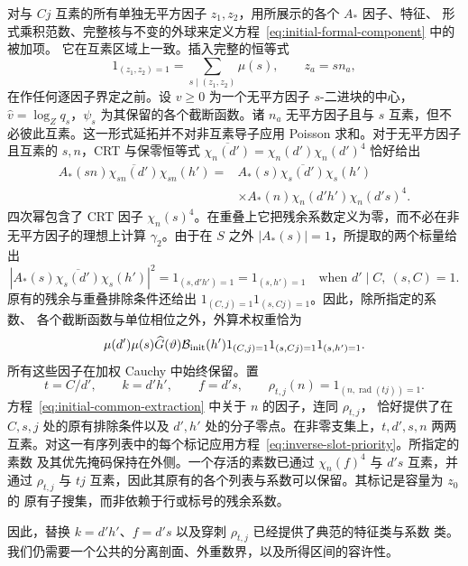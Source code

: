 对与 \(Cj\) 互素的所有单独无平方因子 \(z_1,z_2\)，用所展示的各个 \(A_*\) 因子、特征、
形式乘积范数、完整核与不变的外球来定义方程~\eqref{eq:initial-formal-component} 中的被加项。
它在互素区域上一致。插入完整的恒等式
\[
 1_{(z_1,z_2)=1}=\sum_{s\mid(z_1,z_2)}\mu(s),\qquad z_a=sn_a,
\]
在作任何逐因子界定之前。设 \(v\ge0\) 为一个无平方因子 \(s\)-二进块的中心，
\(\widehat v=\log_Zq_s\)，\(\psi_s\) 为其保留的各个截断函数。诸 \(n_a\) 无平方因子且与 \(s\)
互素，但不必彼此互素。这一形式延拓并不对非互素导子应用 Poisson 求和。对于无平方因子且互素的
\(s,n\)，CRT 与保零恒等式 \(\overline{\chi_n(d')}=\chi_n(d')\chi_n(d')^4\) 恰好给出
\begin{equation}\label{eq:initial-common-extraction}
 \begin{split}
 A_*(sn)\overline{\chi_{sn}(d')}\chi_{sn}(h')
 ={}&A_*(s)\overline{\chi_s(d')}\chi_s(h')\\
 &\times A_*(n)\chi_n(d'h')\chi_n(d's)^4.
 \end{split}
\end{equation}
四次幂包含了 CRT 因子 \(\chi_n(s)^4\)。在重叠上它把残余系数定义为零，而不必在非
无平方因子的理想上计算 \(\gamma_2\)。由于在 \(S\) 之外 \(|A_*(s)|=1\)，所提取的两个标量给出
\[
 |A_*(s)\overline{\chi_s(d')}\chi_s(h')|^2
 =1_{(s,d'h')=1}=1_{(s,h')=1}
 \quad\text{when }d'\mid C,\ (s,C)=1.
\]
原有的残余与重叠排除条件还给出 \(1_{(C,j)=1}1_{(s,Cj)=1}\)。因此，除所指定的系数、
各个截断函数与单位相位之外，外算术权重恰为
\begin{equation}\label{eq:initial-outer-arithmetic}
 \mu(d')\mu(s)\widehat G(\vartheta)\mathcal B_{\rm init}(h')
 1_{(C,j)=1}1_{(s,Cj)=1}1_{(s,h')=1}.
\end{equation}
所有这些因子在加权 Cauchy 中始终保留。置
\[
 t=C/d',\qquad k=d'h',\qquad f=d's,\qquad
 \rho_{t,j}(n)=1_{(n,\operatorname{rad}(tj))=1}.
\]
方程~\eqref{eq:initial-common-extraction} 中关于 \(n\) 的因子，连同 \(\rho_{t,j}\)，
恰好提供了在 \(C,s,j\) 处的原有排除条件以及 \(d',h'\) 处的分子零点。在非零支集上，\(t,d',s,n\)
两两互素。对这一有序列表中的每个标记应用方程~\eqref{eq:inverse-slot-priority}。所指定的素数
及其优先掩码保持在外侧。一个存活的素数已通过 \(\chi_n(f)^4\) 与 \(d's\) 互素，并通过
\(\rho_{t,j}\) 与 \(tj\) 互素，因此其原有的各个列表与系数可以保留。其标记是容量为 \(z_0\) 的
原有子搜集，而非依赖于行或标号的残余系数。

因此，替换 \(k=d'h'\)、\(f=d's\) 以及穿刺 \(\rho_{t,j}\) 已经提供了典范的特征类与系数
类。我们仍需要一个公共的分离剖面、外重数界，以及所得区间的容许性。

